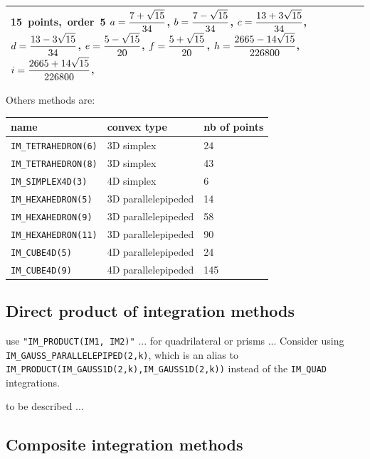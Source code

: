 \documentclass[11pt,a4paper]{article}
\begin{document}
\begin{tabular}{|m{2.5cm}|m{5.5cm}|m{1.2cm}|m{6cm}|}
    \mbox{15 points, order 5} \hspace{7em}
    \mbox{$a = {\displaystyle \frac{\displaystyle 7 + \sqrt{15}}{\displaystyle 34}}$,}
    \mbox{$b = {\displaystyle \frac{\displaystyle 7 - \sqrt{15}}{\displaystyle 34}}$,}\hspace{5em}
    \mbox{$c = {\displaystyle \frac{\displaystyle 13 + 3\sqrt{15}}{\displaystyle 34}}$,}
    \mbox{$d = {\displaystyle \frac{\displaystyle 13 - 3\sqrt{15}}{\displaystyle 34}}$,}\hspace{5em}
    \mbox{$e = {\displaystyle \frac{\displaystyle 5 - \sqrt{15}}{\displaystyle 20}}$,}
    \mbox{$f = {\displaystyle \frac{\displaystyle 5 + \sqrt{15}}{\displaystyle 20}}$,}\hspace{5em}
    \mbox{$h = {\displaystyle \frac{\displaystyle 2665 - 14\sqrt{15}}{\displaystyle 226800}}$,}\hspace{5em} 
    \mbox{$i = {\displaystyle \frac{\displaystyle 2665 + 14\sqrt{15}}{\displaystyle 226800}}$,}\hspace{5em} 
  \\ \hline
\end{tabular}

Others methods are:
\begin{center}
  \begin{tabular}{|lll|}
    \hline name & convex type & nb of points\\
    \hline \texttt{IM\_TETRAHEDRON(6)} & 3D simplex & 24\\
    \texttt{IM\_TETRAHEDRON(8)} & 3D simplex & 43\\
    \texttt{IM\_SIMPLEX4D(3)}   & 4D simplex & 6\\
    \texttt{IM\_HEXAHEDRON(5)}  & 3D parallelepipeded & 14\\
    \texttt{IM\_HEXAHEDRON(9)}  & 3D parallelepipeded & 58\\
    \texttt{IM\_HEXAHEDRON(11)}  & 3D parallelepipeded & 90\\
    \texttt{IM\_CUBE4D(5)}      & 4D parallelepipeded & 24\\
    \texttt{IM\_CUBE4D(9)}      & 4D parallelepipeded & 145\\
    \hline
  \end{tabular}
\end{center}
\subsection{Direct product of integration methods}
use {\tt "IM\_PRODUCT(IM1, IM2)"} ... for quadrilateral or prisms ... Consider using \texttt{IM\_GAUSS\_PARALLELEPIPED(2,k)}, which is an alias to \texttt{IM\_PRODUCT(IM\_GAUSS1D(2,k),IM\_GAUSS1D(2,k))} instead of the \texttt{IM\_QUAD} integrations.

to be described ...

\subsection{Composite integration methods}
\end{document}
